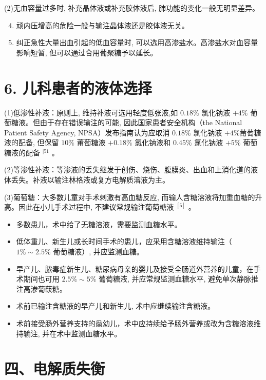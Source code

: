 \documentclass[10pt]{article}
\begin{document}
(2)无血容量过多时, 补充晶体液或补充胶体液后, 肺功能的变化一般无明显差异。

\begin{enumerate}
  \setcounter{enumi}{3}
  \item 顽内压增高的危险一般与输注晶体液还是胶体液无关。

  \item 纠正急性大量出血引起的低血容量时, 可以选用高渗盐水。高渗盐水对血容量影响短暂, 但可以通过合用葡聚糖予以延长。

\end{enumerate}

\section*{6. 儿科患者的液体选择}
(1)低渗性补液：原则上, 维持补液可选用轻度低张液,如 $0.18 \%$ 氯化钠液 $+4 \%$ 葡萄糖液。但由于存在错误输注的可能, 因此国家患者安全机构（the National Patient Safety Agency, NPSA）发布指南认为应取消 $0.18 \%$ 氯化钠液 $+4 \%$莆萄糖液的配备, 但保留 $10 \%$ 莆萄糖液 $+0.18 \%$ 氯化钠液和 $0.45 \%$ 氯化钠液 $+5 \%$ 葡萄糖液的配备 ${ }^{\mid 51}$ 。

(2)等渗性补液：等渗液的丢失继发于创伤、烧伤、腹膜炎、出血和上消化道的液体丢失。补液以输注林格液或复方电解质溶液为主。

(3)葡萄糖：大多数儿童对手术刺激有高血糖反应, 而输人含糖溶液将加重血糖的升高。因此在小儿手术过程中, 不建议常规输注葡萄糖液 ${ }^{[5]}$ 。

\begin{itemize}
  \item 多数患儿，术中给了无糖溶液，需要监测血糖水平。
  \item 低体重儿、新生儿或长时间手术的患儿，应采用含糖溶液维持输注（ $1 \% \sim 2.5 \%$ 葡萄糖液）, 并应监测血糖。
  \item 早产儿、脓毒症新生儿、糖尿病母亲的婴儿及接受全肠道外营养的儿童，在手术期间也可用 $2.5 \% \sim 5 \%$ 葡萄糖液, 并应常规监测血糖水平, 避免单次静脉推注高渗葡蒛糖。
  \item 术前已输注含糖液的早产儿和新生儿, 术中应继续输注含糖液。
  \item 术前接受肠外营养支持的赑幼儿，术中应持续给予肠外营养或改为含糖溶液维持输注, 并在术中监测血糖水平。
\end{itemize}

\section*{四、电解质失衡}
\end{document}

